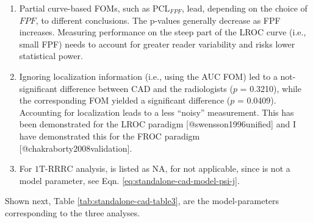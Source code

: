 \documentclass[
]{article}
\begin{document}
\begin{enumerate}
\item
  Partial curve-based FOMs, such as \(\text{PCL}_{FPF}\), lead, depending on the choice of \(FPF\), to different conclusions. The p-values generally decrease as FPF increases. Measuring performance on the steep part of the LROC curve (i.e., small FPF) needs to account for greater reader variability and risks lower statistical power.
\item
  Ignoring localization information (i.e., using the AUC FOM) led to a not-significant difference between CAD and the radiologists (\(p\) = 0.3210), while the corresponding FOM yielded a significant difference (\(p\) = 0.0409). Accounting for localization leads to a less ``noisy'' measurement. This has been demonstrated for the LROC paradigm {[}@swensson1996unified{]} and I have demonstrated this for the FROC paradigm {[}@chakraborty2008validation{]}.
\item
  For \(\text{1T-RRRC}\) analysis, is listed as NA, for not applicable, since is not a model parameter, see Eqn. \eqref{eq:standalone-cad-model-psi-j}.
\end{enumerate}

Shown next, Table \ref{tab:standalone-cad-table3}, are the model-parameters corresponding to the three analyses.
\end{document}
